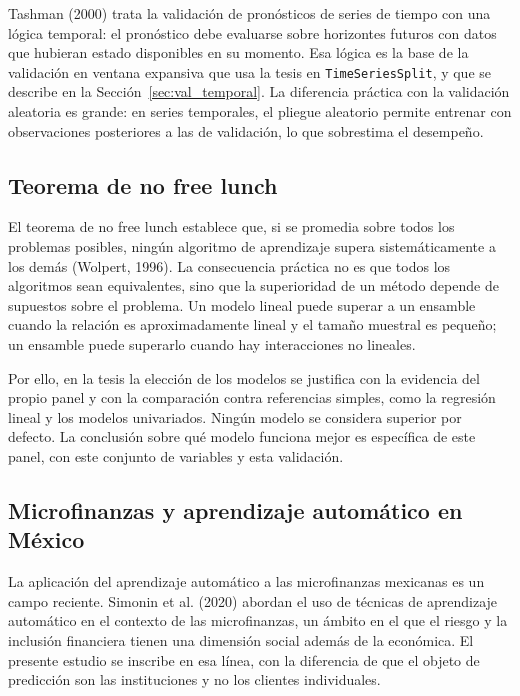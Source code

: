 Tashman (2000) trata la validación de pronósticos de series de tiempo con una lógica temporal: el pronóstico debe evaluarse sobre horizontes futuros con datos que hubieran estado disponibles en su momento. Esa lógica es la base de la validación en ventana expansiva que usa la tesis en \texttt{TimeSeriesSplit}, y que se describe en la Sección~\ref{sec:val_temporal}. La diferencia práctica con la validación aleatoria es grande: en series temporales, el pliegue aleatorio permite entrenar con observaciones posteriores a las de validación, lo que sobrestima el desempeño.

\subsection{Teorema de no free lunch}
El teorema de no free lunch establece que, si se promedia sobre todos los problemas posibles, ningún algoritmo de aprendizaje supera sistemáticamente a los demás (Wolpert, 1996). La consecuencia práctica no es que todos los algoritmos sean equivalentes, sino que la superioridad de un método depende de supuestos sobre el problema. Un modelo lineal puede superar a un ensamble cuando la relación es aproximadamente lineal y el tamaño muestral es pequeño; un ensamble puede superarlo cuando hay interacciones no lineales.

Por ello, en la tesis la elección de los modelos se justifica con la evidencia del propio panel y con la comparación contra referencias simples, como la regresión lineal y los modelos univariados. Ningún modelo se considera superior por defecto. La conclusión sobre qué modelo funciona mejor es específica de este panel, con este conjunto de variables y esta validación.

\subsection{Microfinanzas y aprendizaje automático en México}
La aplicación del aprendizaje automático a las microfinanzas mexicanas es un campo reciente. Simonin et al. (2020) abordan el uso de técnicas de aprendizaje automático en el contexto de las microfinanzas, un ámbito en el que el riesgo y la inclusión financiera tienen una dimensión social además de la económica. El presente estudio se inscribe en esa línea, con la diferencia de que el objeto de predicción son las instituciones y no los clientes individuales. %

